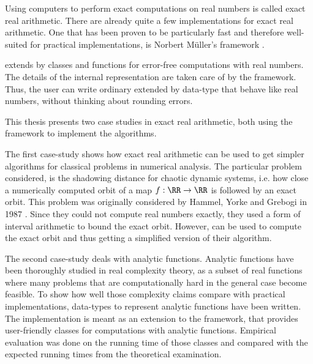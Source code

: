 Using computers to perform exact computations on real numbers is called exact
real arithmetic.
There are already quite a few implementations for exact real arithmetic.
One that has been proven to be particularly fast and therefore well-suited for
practical implementations, is Norbert M\"uller's \cc framework \irram
\cite{irram}.

\irram extends \cc by classes and functions for error-free computations with
real numbers.
The details of the internal representation are taken care of by the framework. 
Thus, the user can write ordinary \cc extended by data-type that behave like
real numbers, without thinking about rounding errors.

This thesis presents two case studies in exact real arithmetic, both using the
\irram framework to implement the algorithms.

The first case-study shows how exact real arithmetic can be used to get simpler
algorithms for classical problems in numerical analysis.
The particular problem considered, is the shadowing distance for chaotic
dynamic systems, i.e. how close a numerically computed orbit of a map $f: \RR
\to \RR$ is followed by an exact orbit.
This problem was originally considered by Hammel, Yorke and Grebogi in 1987
\cite{Hammel1987}. 
Since they could not compute real numbers exactly, they used a form of interval
arithmetic to bound the exact orbit.
However, \irram can be used to compute the exact orbit and thus getting a
simplified version of their algorithm.

The second case-study deals with analytic functions. 
Analytic functions have been thoroughly studied in real complexity theory, as a
subset of real functions where many problems that are computationally hard in
the general case become feasible. 
To show how well those complexity claims compare with practical
implementations, data-types to represent analytic functions have been written.
The implementation is meant as an extension to the \irram framework, that
provides user-friendly classes for computations with analytic functions.
Empirical evaluation was done on the running time of those classes and compared
with the expected running times from the theoretical examination.

